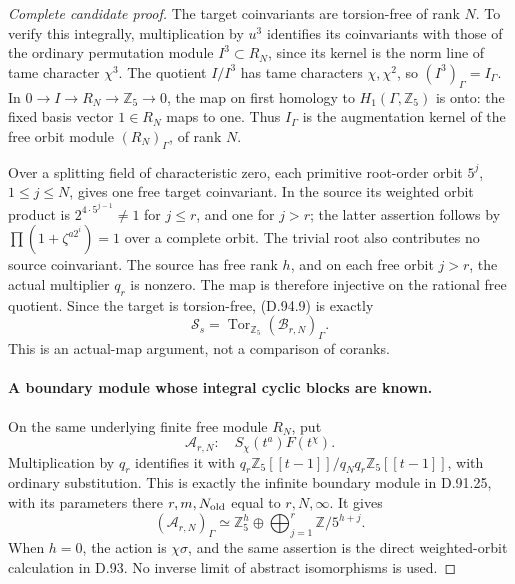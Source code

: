 \begin{proof}[Complete candidate proof]
The target coinvariants are torsion-free of rank \(N\).
To verify this integrally, multiplication by \(u^3\)
identifies its coinvariants with those of the ordinary
permutation module \(I^3\subset R_N\), since its kernel
is the norm line of tame character \(\chi^3\).
The quotient \(I/I^3\) has tame characters \(\chi,\chi^2\),
so \((I^3)_\Gamma=I_\Gamma\). In
\(0\to I\to R_N\to\mathbb Z_5\to0\), the map on
first homology to \(H_1(\Gamma,\mathbb Z_5)\) is onto:
the fixed basis vector \(1\in R_N\) maps to one.
Thus \(I_\Gamma\) is the augmentation kernel of the free
orbit module \((R_N)_\Gamma\), of rank \(N\).

Over a splitting field of characteristic zero, each primitive
root-order orbit \(5^j\), \(1\le j\le N\), gives one
free target coinvariant. In the source its weighted orbit
product is \(2^{4\cdot5^{j-1}}\ne1\) for \(j\le r\),
and one for \(j>r\); the latter assertion follows by
\(\prod(1+\zeta^{a2^i})=1\) over a complete orbit.
The trivial root also contributes no source coinvariant.
The source has free rank \(h\), and on each free orbit
\(j>r\), the actual multiplier \(q_r\) is nonzero.
The map is therefore injective on the rational free quotient.
Since the target is torsion-free, (D.94.9) is exactly
\[
                  \mathcal S_s=\operatorname{Tor}_{\mathbb Z_5}
                              (\mathscr B_{r,N})_\Gamma.
                                                        \tag{D.94.12}
\]
This is an actual-map argument, not a comparison of coranks.

\paragraph{A boundary module whose integral cyclic blocks are known.}
On the same underlying finite free module \(R_N\), put
\[
              \mathscr A_{r,N}:\quad
                       S_\chi(t^a)F(t^\chi).
                                                        \tag{D.94.13}
\]
Multiplication by \(q_r\) identifies it with
\(q_r\mathbb Z_5[[t-1]]/q_Nq_r\mathbb Z_5[[t-1]]\),
with ordinary substitution. This is exactly the infinite
boundary module in D.91.25, with its parameters there
\(r,m,N_{\rm old}\) equal to \(r,N,\infty\). It gives
\[
 (\mathscr A_{r,N})_\Gamma\simeq
        \mathbb Z_5^h\oplus
                       \bigoplus_{j=1}^{r}\mathbb Z/5^{h+j}.
                                                        \tag{D.94.14}
\]
When \(h=0\), the action is \(\chi\sigma\), and the
same assertion is the direct weighted-orbit calculation
in D.93. No inverse limit of abstract isomorphisms is used.


\end{proof}
